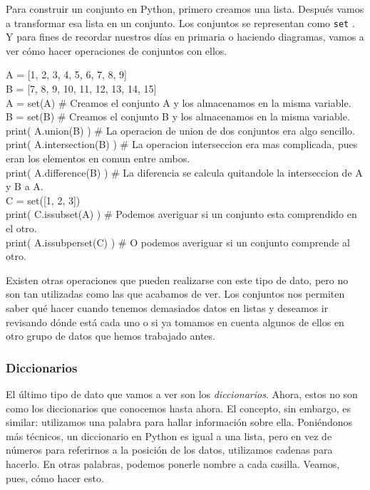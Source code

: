 \documentclass[10pt,letterpaper]{article}
\newcommand{\inlinecode}[1]{
\colorbox{light-gray}{\texttt{#1}}
}
\newenvironment{Code}
{
\begin{lrbox}{\selvestebox}%
\begin{minipage}{\dimexpr\columnwidth-2\fboxsep\relax}
\fontfamily{\ttdefault}\selectfont
}
{\end{minipage}\end{lrbox}%
\begin{center}
\colorbox{light-gray}{\usebox{\selvestebox}}
\end{center}
}
\begin{document}
Para construir un conjunto en Python, primero creamos una lista. Despu\'es vamos a transformar esa lista en un conjunto. Los conjuntos se representan como \inlinecode{set}. Y para fines de recordar nuestros d\'ias en primaria o haciendo diagramas, vamos a ver c\'omo hacer operaciones de conjuntos con ellos.

\begin{Code}
A = [1, 2, 3, 4, 5, 6, 7, 8, 9]\\
B = [7, 8, 9, 10, 11, 12, 13, 14, 15]\\

A = set(A) \# Creamos el conjunto A y los almacenamos en la misma variable. \\
B = set(B) \# Creamos el conjunto B y los almacenamos en la misma variable. \\

print( A.union(B) ) \# La operacion de union de dos conjuntos era algo sencillo. \\
print( A.intersection(B) ) \# La operacion interseccion era mas complicada, pues eran los elementos en comun entre ambos.\\
print( A.difference(B) ) \# La diferencia se calcula quitandole la interseccion de A y B a A.\\

C = set([1, 2, 3])\\
print( C.issubset(A) ) \# Podemos averiguar si un conjunto esta comprendido en el otro.\\
print( A.issubperset(C) ) \# O podemos averiguar si un conjunto comprende al otro.
\end{Code}

Existen otras operaciones que pueden realizarse con este tipo de dato, pero no son tan utilizadas como las que acabamos de ver. Los conjuntos nos permiten saber qu\'e hacer cuando tenemos demasiados datos en listas y deseamos ir revisando d\'onde est\'a cada uno o si ya tomamos en cuenta algunos de ellos en otro grupo de datos que hemos trabajado antes.

\subsubsection{Diccionarios}
El \'ultimo tipo de dato que vamos a ver son los \emph{diccionarios}. Ahora, estos no son como los diccionarios que conocemos hasta ahora. El concepto, sin embargo, es similar: utilizamos una palabra para hallar informaci\'on sobre ella. Poni\'endonos m\'as t\'ecnicos, un diccionario en Python es igual a una lista, pero en vez de n\'umeros para referirnos a la posici\'on de los datos, utilizamos cadenas para hacerlo. En otras palabras, podemos ponerle nombre a cada casilla. Veamos, pues, c\'omo hacer esto.\\
\end{document}
